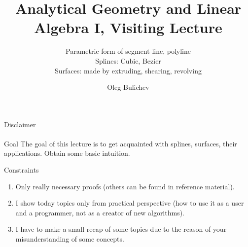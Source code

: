\documentclass[aspectratio=169]{beamer}
\title[AGLA1]{Analytical Geometry and Linear Algebra I, Visiting Lecture} %
\subtitle{Parametric form of segment line, polyline
\\ Splines: Cubic, Bezier \\ Surfaces: made by extruding, shearing, revolving 
         } %
\author{Oleg Bulichev}
\newcommand{\fbckg}[1]{\usebackgroundtemplate{\texttt{[image: \#1]}}}%
\begin{document}
\setlength{\abovedisplayskip}{0pt}
\setlength{\belowdisplayskip}{0pt}
\setlength{\abovedisplayshortskip}{0pt}
\setlength{\belowdisplayshortskip}{0pt}

\fbckg{fibeamer/figs/title_page.png}
\note{
    \begin{enumerate}
        \item \ 

    \end{enumerate}
}

\fbckg{fibeamer/figs/common.png}



\begin{frame}[t]{Disclaimer}
\framesubtitle{}
\begin{block}{Goal}
    The goal of this lecture is to get acquainted with splines, surfaces, their applications. Obtain some basic intuition. 
\end{block}
\vspace{-0.2cm}
\begin{alertblock}{Constraints}
    \begin{enumerate}
        \item Only really necessary proofs (others can be found in reference material).
        \item I show today topics only from practical perspective (how to use it as a user and a programmer, not as a creator of new algorithms).
        \item I have to make a small recap of some topics due to the reason of your misunderstanding of some concepts. 
    \end{enumerate}
\end{alertblock}
\end{frame}
\end{document}
